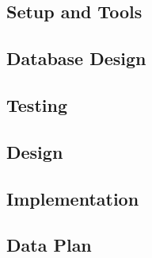 \subsection{Setup and Tools}
\label{subsubsec:dbsetup}


\subsection{Database Design}
\label{subsubsec:Database Design}


\subsection{Testing}
\label{subsubsec:dbtesting}
%

\subsection{Design}
\label{subsubsec:dbdesign}


\subsection{Implementation}
\label{subsubsec:dbimplementation}


\subsection{Data Plan}
\label{subsubsec:dbdataplan}
%
